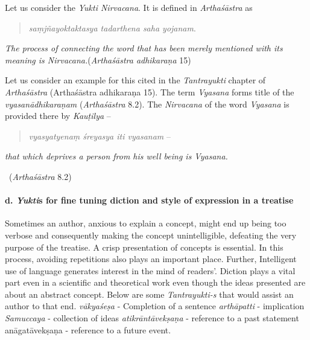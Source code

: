 Let us consider the \textit{Yukti Nirvacana}. It is defined in \textit{Arthaśāstra} as

\begin{quote}
\textit{saṃjñayoktaktasya tadarthena saha yojanam}.
\end{quote}

\begin{myquote}
\textit{The process of connecting the word that has been merely mentioned with its meaning is Nirvacana.}\hfill (\textit{Arthaśāstra adhikaraṇa} 15)
\end{myquote}

Let us consider an example for this cited in the \textit{Tantrayukti} chapter of \textit{Arthaśāstra} (Arthaśāstra adhikaraṇa 15). The term \textit{Vyasana} forms title of the \textit{vyasanādhikaraṇam} (\textit{Arthaśāstra} 8.2). The \textit{Nirvacana} of the word \textit{Vyasana} is provided there by \textit{Kauṭilya} –

\begin{verse}
\textit{vyasyatyenaṃ śreyasya iti vyasanam} –
\end{verse}

\begin{myquote}
\textit{that which deprives a person from his well being is Vyasana.}

~\hfill (\textit{Arthaśāstra} 8.2)
\end{myquote}

\newpage


\paragraph*{d. \textit{Yukti}s for fine tuning diction and style of expression in a treatise}

Sometimes an author, anxious to explain a concept, might end up being too verbose and consequently making the concept unintelligible, defeating the very purpose of the treatise. A crisp presentation of concepts is essential. In this process, avoiding repetitions also plays an important place. Further, Intelligent use of language generates interest in the mind of readers’. Diction plays a vital part even in a scientific and theoretical work even though the ideas presented are about an abstract concept. Below are some \textit{Tantrayukti-s} that would assist an author to that end. \textit{vākyaśeṣa} - Completion of a sentence \textit{arthāpatti} - implication \textit{Samuccaya} - collection of ideas \textit{atikrāntāvekṣaṇa} - reference to a past statement anāgatāvekṣaṇa - reference to a future event.

